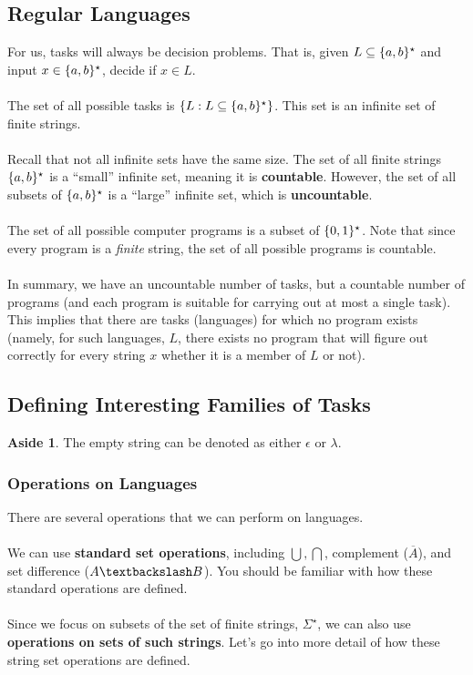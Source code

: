 \documentclass[]{article}
\DeclarePairedDelimiter{\set}{\lbrace}{\rbrace}
\theoremstyle{definition}
\newtheorem*{aside}{Aside}
\newcommand{\lecture}[1]{\marginpar{{\footnotesize $\leftarrow$ \underline{#1}}}}
\begin{document}
      \subsection{Regular Languages}
        For us, tasks will always be decision problems. That is, given $L \subseteq \set{a, b}^\star$ and input $x \in \set{a, b}^\star$, decide if $x \in L$.
        \\ \\
        The set of all possible tasks is $\set{L : L \subseteq \set{a, b}^\star}$. This set is an infinite set of finite strings.
        \\ \\
        Recall that not all infinite sets have the same size. The set of all finite strings $\set{a, b}^\star$ is a ``small'' infinite set, meaning it is \textbf{countable}. However, the set of all subsets of $\set{a, b}^\star$ is a ``large'' infinite set, which is \textbf{uncountable}.
        \\ \\
        The set of all possible computer programs is a subset of $\set{0, 1}^\star$. Note that since every program is a \emph{finite} string, the set of all possible programs is countable.
        \\ \\
        In summary, we have an uncountable number of tasks, but a countable number of programs (and each program is suitable for carrying out at most a single task). This implies that there are tasks (languages) for which no program exists (namely, for such languages, $L$, there exists no program that will figure out correctly for every string $x$ whether it is a member of $L$ or not).

      \subsection{Defining Interesting Families of Tasks} \lecture{September 17, 2013}
        \begin{aside}
          The empty string can be denoted as either $\epsilon$ or $\lambda$.
        \end{aside}

        \subsubsection{Operations on Languages}
          There are several operations that we can perform on languages.
          \\ \\
          We can use \textbf{standard set operations}, including $\bigcup, \bigcap$, complement ($\overline A$), and set difference ($A \textbackslash B$). You should be familiar with how these standard operations are defined.
          \\ \\
          Since we focus on subsets of the set of finite strings, $\Sigma^\star$, we can also use \textbf{operations on sets of such strings}. Let's go into more detail of how these string set operations are defined.
\end{document}
